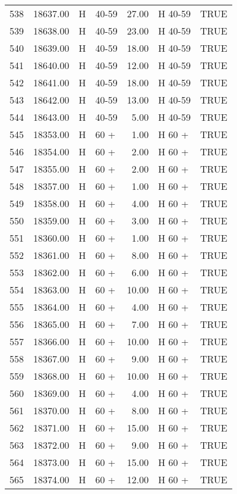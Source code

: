 \begin{table}[ht]
\begin{tabular}{rrllrll}
  538 & 18637.00 & H & 40-59 & 27.00 & H 40-59 & TRUE \\ 
  539 & 18638.00 & H & 40-59 & 23.00 & H 40-59 & TRUE \\ 
  540 & 18639.00 & H & 40-59 & 18.00 & H 40-59 & TRUE \\ 
  541 & 18640.00 & H & 40-59 & 12.00 & H 40-59 & TRUE \\ 
  542 & 18641.00 & H & 40-59 & 18.00 & H 40-59 & TRUE \\ 
  543 & 18642.00 & H & 40-59 & 13.00 & H 40-59 & TRUE \\ 
  544 & 18643.00 & H & 40-59 & 5.00 & H 40-59 & TRUE \\ 
  545 & 18353.00 & H & 60 + & 1.00 & H 60 + & TRUE \\ 
  546 & 18354.00 & H & 60 + & 2.00 & H 60 + & TRUE \\ 
  547 & 18355.00 & H & 60 + & 2.00 & H 60 + & TRUE \\ 
  548 & 18357.00 & H & 60 + & 1.00 & H 60 + & TRUE \\ 
  549 & 18358.00 & H & 60 + & 4.00 & H 60 + & TRUE \\ 
  550 & 18359.00 & H & 60 + & 3.00 & H 60 + & TRUE \\ 
  551 & 18360.00 & H & 60 + & 1.00 & H 60 + & TRUE \\ 
  552 & 18361.00 & H & 60 + & 8.00 & H 60 + & TRUE \\ 
  553 & 18362.00 & H & 60 + & 6.00 & H 60 + & TRUE \\ 
  554 & 18363.00 & H & 60 + & 10.00 & H 60 + & TRUE \\ 
  555 & 18364.00 & H & 60 + & 4.00 & H 60 + & TRUE \\ 
  556 & 18365.00 & H & 60 + & 7.00 & H 60 + & TRUE \\ 
  557 & 18366.00 & H & 60 + & 10.00 & H 60 + & TRUE \\ 
  558 & 18367.00 & H & 60 + & 9.00 & H 60 + & TRUE \\ 
  559 & 18368.00 & H & 60 + & 10.00 & H 60 + & TRUE \\ 
  560 & 18369.00 & H & 60 + & 4.00 & H 60 + & TRUE \\ 
  561 & 18370.00 & H & 60 + & 8.00 & H 60 + & TRUE \\ 
  562 & 18371.00 & H & 60 + & 15.00 & H 60 + & TRUE \\ 
  563 & 18372.00 & H & 60 + & 9.00 & H 60 + & TRUE \\ 
  564 & 18373.00 & H & 60 + & 15.00 & H 60 + & TRUE \\ 
  565 & 18374.00 & H & 60 + & 12.00 & H 60 + & TRUE \\ 

\end{tabular}
\end{table}
